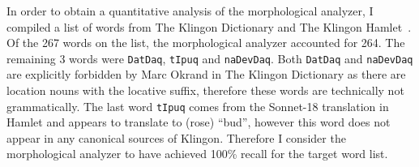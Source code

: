 \documentclass[11pt]{article}
\begin{document}
In order to obtain a quantitative analysis of the morphological analyzer, I compiled a list of words from The Klingon Dictionary and The Klingon Hamlet~\cite{0964434512}. Of the 267 words on the list, the morphological analyzer accounted for 264. The remaining 3 words were \texttt{DatDaq}, \texttt{tIpuq} and \texttt{naDevDaq}. Both \texttt{DatDaq} and \texttt{naDevDaq} are explicitly forbidden by Marc Okrand in The Klingon Dictionary as there are location nouns with the locative suffix, therefore these words are technically not grammatically. The last word \texttt{tIpuq} comes from the Sonnet-18 translation in Hamlet and appears to translate to (rose) ``bud'', however this word does not appear in any canonical sources of Klingon. Therefore I consider the morphological analyzer to have achieved 100\% recall for the target word list.



\end{document}
